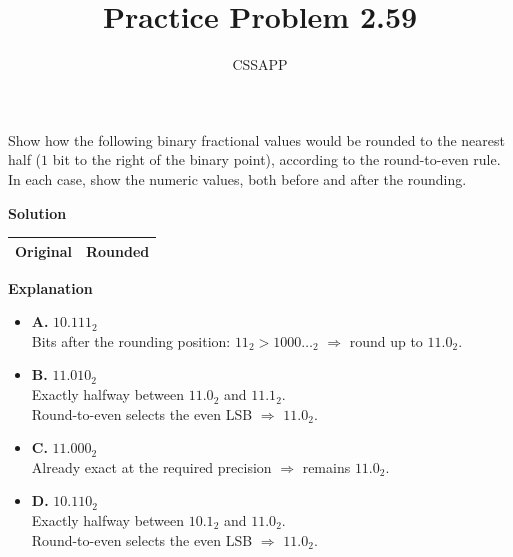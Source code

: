 \documentclass{article}
\title{Practice Problem 2.59}
\author{CSSAPP}
\begin{document}
\maketitle

\begin{flushleft}
Show how the following binary fractional values would be rounded to the nearest half
($1$ bit to the right of the binary point), according to the round-to-even rule.
In each case, show the numeric values, both before and after the rounding.

\bigskip
\textbf{Solution}

\begin{tabular}{@{}ll@{}}
\toprule
\textbf{Original} & \textbf{Rounded} \\
\midrule

\bottomrule
\end{tabular}

\bigskip
\textbf{Explanation}

\begin{itemize}
  \item \textbf{A.} $10.111_2$ \\
  Bits after the rounding position: $11_2 > 1000\ldots_2$ $\Rightarrow$ round up to $11.0_2$.

  \item \textbf{B.} $11.010_2$ \\
  Exactly halfway between $11.0_2$ and $11.1_2$. \\
  Round-to-even selects the even LSB $\Rightarrow$ $11.0_2$.

  \item \textbf{C.} $11.000_2$ \\
  Already exact at the required precision $\Rightarrow$ remains $11.0_2$.

  \item \textbf{D.} $10.110_2$ \\
  Exactly halfway between $10.1_2$ and $11.0_2$. \\
  Round-to-even selects the even LSB $\Rightarrow$ $11.0_2$.
\end{itemize}
\end{flushleft}
\end{document}
